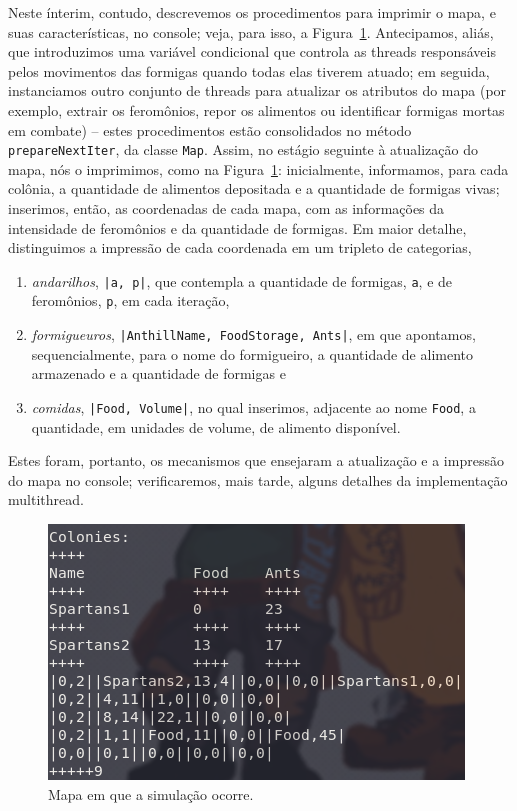 \documentclass[12pt]{article}
\theoremstyle{definition}
\begin{document}
Neste ínterim, contudo, descrevemos os procedimentos para imprimir o mapa, e suas características, no console; veja, para isso, a Figura~\ref{fig:map}. Antecipamos, aliás, que introduzimos uma variável condicional que controla as threads responsáveis pelos movimentos das formigas quando todas elas tiverem atuado; em seguida, instanciamos outro conjunto de threads para atualizar os atributos do mapa (por exemplo, extrair os feromônios, repor os alimentos ou identificar formigas mortas em combate) -- estes procedimentos estão consolidados no método \texttt{prepareNextIter}, da classe \texttt{Map}. Assim, no estágio seguinte à atualização do mapa, nós o imprimimos, como na Figura~\ref{fig:map}: inicialmente, informamos, para cada colônia, a quantidade de alimentos depositada e a quantidade de formigas vivas; inserimos, então, as coordenadas de cada mapa, com as informações da intensidade de feromônios e da quantidade de formigas. Em maior detalhe, distinguimos a impressão de cada coordenada em um tripleto de categorias, 

\begin{enumerate} 
	\item \textit{andarilhos}, \texttt{|a, p|}, que contempla a quantidade de formigas, \texttt{a}, e de feromônios, \texttt{p}, em cada iteração, 
	\item \textit{formigueuros}, \texttt{|AnthillName, FoodStorage, Ants|}, em que apontamos, sequencialmente, para o nome do formigueiro, a quantidade de alimento armazenado e a quantidade de formigas e 
	\item \textit{comidas}, \texttt{|Food, Volume|}, no qual inserimos, adjacente ao nome \texttt{Food}, a quantidade, em unidades de volume, de alimento disponível. 
\end{enumerate} 

\noindent Estes foram, portanto, os mecanismos que ensejaram a atualização e a impressão do mapa no console; verificaremos, mais tarde, alguns detalhes da implementação multithread. 

\begin{figure} 
	\centering 
	\includegraphics[width = \textwidth]{map.png} 
	\caption{Mapa em que a simulação ocorre.} 
	\label{fig:map} 
\end{figure} 
\end{document}
